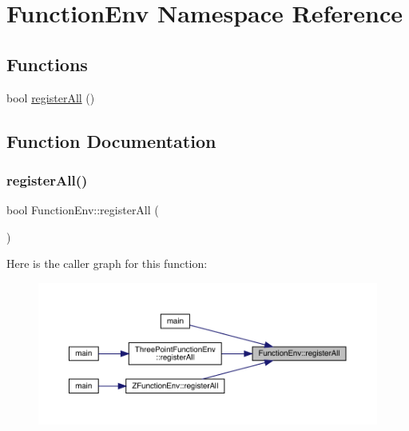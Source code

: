 \hypertarget{namespaceFunctionEnv}{}\section{Function\+Env Namespace Reference}
\label{namespaceFunctionEnv}
\subsection*{Functions}
\begin{DoxyCompactItemize}
\item 
bool \mbox{\hyperlink{namespaceFunctionEnv_a5a6d409449117cd980d4545c2c9aa065}{register\+All}} ()
\end{DoxyCompactItemize}


\subsection{Function Documentation}
\mbox{\label{namespaceFunctionEnv_a5a6d409449117cd980d4545c2c9aa065}} 
\subsubsection{\texorpdfstring{registerAll()}{registerAll()}}
{\footnotesize\ttfamily bool Function\+Env\+::register\+All (\begin{DoxyParamCaption}{ }\end{DoxyParamCaption})}

Here is the caller graph for this function\+:
\nopagebreak
\begin{figure}[H]
\begin{center}
\leavevmode
\includegraphics[width=350pt]{dd/d1d/namespaceFunctionEnv_a5a6d409449117cd980d4545c2c9aa065_icgraph}
\end{center}
\end{figure}

